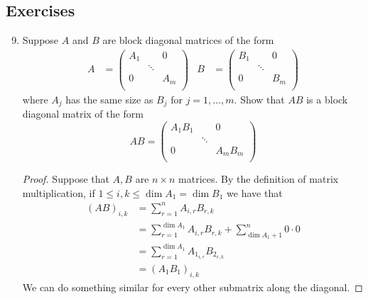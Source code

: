 \documentclass[../main.tex]{subfiles}
\begin{document}
\subsection*{Exercises}
\begin{enumerate}[label={\textbf{\arabic*}},labelsep=1em,ref={\thesection.\arabic*}]
    \setcounter{enumi}{8}
    \item {}\label{exr:8.B.9}Suppose $A$ and $B$ are block diagonal matrices of the form
    \begin{align*}
        A &=
        \begin{pmatrix}
            A_1 &  & 0\\
             & \ddots & \\
            0 &  & A_m\\
        \end{pmatrix}&
        B &=
        \begin{pmatrix}
            B_1 &  & 0\\
             & \ddots & \\
            0 &  & B_m\\
        \end{pmatrix}
    \end{align*}
    where $A_j$ has the same size as $B_j$ for $j=1,\dots,m$. Show that $AB$ is a block diagonal matrix of the form
    \begin{equation*}
        AB =
        \begin{pmatrix}
            A_1B_1 &  & 0\\
             & \ddots & \\
            0 &  & A_mB_m\\
        \end{pmatrix}
    \end{equation*}
    \begin{proof}
        Suppose that $A,B$ are $n\times n$ matrices. By the definition of matrix multiplication, if $1\leq i,k\leq\dim A_1=\dim B_1$ we have that
        \begin{align*}
            (AB)_{i,k} &= \sum_{r=1}^nA_{i,r}B_{r,k}\\
            &= \sum_{r=1}^{\dim A_1}A_{i,r}B_{r,k}+\sum_{\dim A_1+1}^n0\cdot 0\\
            &= \sum_{r=1}^{\dim A_1}A_{1_{i,r}}B_{2_{r,k}}\\
            &= (A_1B_1)_{i,k}
        \end{align*}
        We can do something similar for every other submatrix along the diagonal.
    \end{proof}
\end{enumerate}
\end{document}
